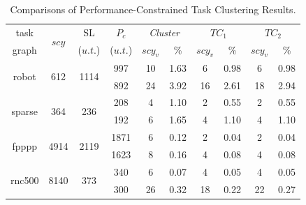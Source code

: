 \documentclass[conference]{IEEEtran}
\begin{document}
\begin{table}[!h]
\renewcommand{\arraystretch}{1}
\caption{Comparisons of Performance-Constrained Task Clustering Results.}
\centering
\begin{tabular}{c|c|c|c|c|c|c|c|c|c}
\hline
\hline
task    &\multicolumn{1}{c|}{\multirow{2}{*}{$scy$}}                          &SL           &$P_c$        & \multicolumn{2}{c|}{\textit{Cluster} \cite{article:CL}}        &\multicolumn{2}{c|}{$TC_1$}   &\multicolumn{2}{c}{$TC_2$}        \\  \cline{5-6} \cline{7-8} \cline{9-10}
graph   &                                                 &\hspace*{-1em}($u.t.$)\hspace*{-1em}         &($u.t.$)       &$scy_v$     & \%  &$scy_v$     & \%   &$scy_v$     & \%    \\

\hline
\hline

\multicolumn{1}{c|}{\multirow{2}{*}{robot}}         & \multicolumn{1}{c|}{\multirow{2}{*}{612}}      &\multicolumn{1}{c|}{\multirow{2}{*}{\hspace*{-0.5em}1114\hspace*{-0.5em}}}      &997  &10     &1.63   &6   &0.98   &6   &0.98     \\
   &    &  &892   &24  &3.92  &16   &2.61    &18  &2.94 \\

\hline
\multicolumn{1}{c|}{\multirow{2}{*}{sparse}}          &\multicolumn{1}{c|}{\multirow{2}{*}{364}}     &\multicolumn{1}{c|}{\multirow{2}{*}{236}}        &208  &4  &1.10   &2   &0.55    &2   &0.55   \\
   & &    &192   &6  &1.65  &4   &1.10  &4    &1.10  \\

\hline
\multicolumn{1}{c|}{\multirow{2}{*}{fpppp}}          &\multicolumn{1}{c|}{\multirow{2}{*}{4914}}   &\multicolumn{1}{c|}{\multirow{2}{*}{\hspace*{-0.5em}2119\hspace*{-0.5em}}}  &\hspace*{-0.5em}1871\hspace*{-0.5em}  &6 &0.12  &2   &0.04  &2   &0.04  \\
   &    &   &\hspace*{-0.5em}1623\hspace*{-0.5em}   &8 &0.16   &4   &0.08  &4  &0.08 \\

\hline
\multicolumn{1}{c|}{\multirow{2}{*}{\hspace*{-0.5em}rnc500\hspace*{-0.5em}}}        &\multicolumn{1}{c|}{\multirow{2}{*}{8140}}     &\multicolumn{1}{c|}{\multirow{2}{*}{373}}    &340   &6  &0.07  &4  &0.05   &4  &0.05   \\
  &   &  &300  &26  &0.32  &18   &0.22  &22  &0.27 \\


\end{tabular}
\end{table}
\end{document}
